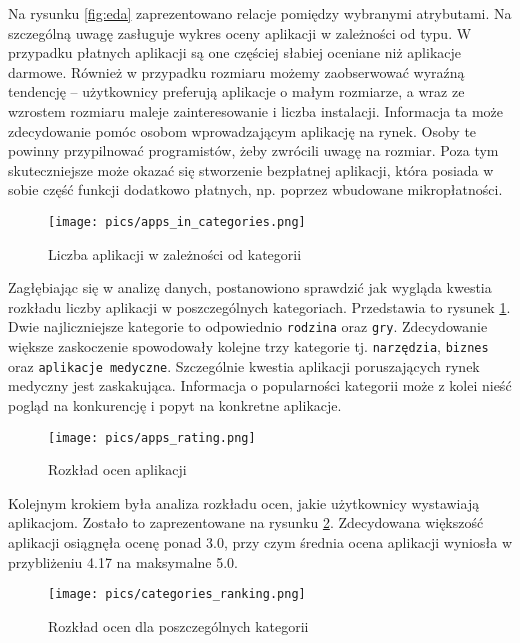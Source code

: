 \documentclass{article}
\begin{document}
Na rysunku \ref{fig:eda} zaprezentowano relacje pomiędzy wybranymi atrybutami. Na szczególną uwagę zasługuje wykres oceny aplikacji w zależności od typu. W przypadku płatnych aplikacji są one częściej słabiej oceniane niż aplikacje darmowe. Również w przypadku rozmiaru możemy zaobserwować wyraźną tendencję -- użytkownicy preferują aplikacje o małym rozmiarze, a wraz ze wzrostem rozmiaru maleje zainteresowanie i liczba instalacji. Informacja ta może zdecydowanie pomóc osobom wprowadzającym aplikację na rynek. Osoby te powinny przypilnować programistów, żeby zwrócili uwagę na rozmiar. Poza tym skuteczniejsze może okazać się stworzenie bezpłatnej aplikacji, która posiada w sobie część funkcji dodatkowo płatnych, np. poprzez wbudowane mikropłatności.

\begin{figure}[!h]
\centering
    \texttt{[image: pics/apps\_in\_categories.png]}
    \caption{Liczba aplikacji w zależności od kategorii}
    \label{fig:apps-in-categories}
\end{figure}

Zagłębiając się w analizę danych, postanowiono sprawdzić jak wygląda kwestia rozkładu liczby aplikacji w poszczególnych kategoriach. Przedstawia to rysunek \ref{fig:apps-in-categories}. Dwie najliczniejsze kategorie to odpowiednio \texttt{rodzina} oraz \texttt{gry}. Zdecydowanie większe zaskoczenie spowodowały kolejne trzy kategorie tj. \texttt{narzędzia}, \texttt{biznes} oraz \texttt{aplikacje medyczne}. Szczególnie kwestia aplikacji poruszających rynek medyczny jest zaskakująca. Informacja o popularności kategorii może z kolei nieść pogląd na konkurencję i popyt na konkretne aplikacje.

\begin{figure}[!h]
\centering
    \texttt{[image: pics/apps\_rating.png]}
    \caption{Rozkład ocen aplikacji}
    \label{fig:apps-rating}
\end{figure}

Kolejnym krokiem była analiza rozkładu ocen, jakie użytkownicy wystawiają aplikacjom. Zostało to zaprezentowane na rysunku \ref{fig:apps-rating}. Zdecydowana większość aplikacji osiągnęła ocenę ponad 3.0, przy czym średnia ocena aplikacji wyniosła w przybliżeniu 4.17 na maksymalne 5.0.

\begin{figure}[!h]
\centering
    \texttt{[image: pics/categories\_ranking.png]}
    \caption{Rozkład ocen dla poszczególnych kategorii}
    \label{fig:categories-rating}
\end{figure}
\end{document}

